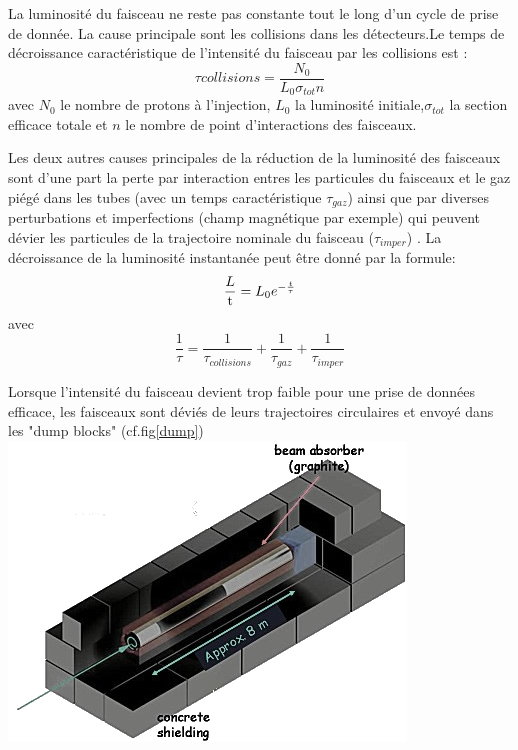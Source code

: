 La luminosité du faisceau ne reste pas constante tout le long d'un cycle de prise de donnée. La cause principale sont les collisions dans les détecteurs.Le temps de décroissance caractéristique de l'intensité du faisceau par les collisions est :
\begin{equation}
\tau{collisions}=\frac{N_{0}}{L_{0}\sigma_{tot}n}
\end{equation}
avec $N_{0}$ le nombre de protons à l'injection, $L_{0}$ la luminosité initiale,$\sigma_{tot}$ la section efficace totale et $n$ le nombre de point d'interactions des faisceaux.

Les deux autres causes principales de la réduction de la luminosité des faisceaux sont d'une part la perte par interaction entres les particules du faisceaux et le gaz piégé dans les tubes (avec un temps caractéristique $\tau_{gaz}$) ainsi que par diverses perturbations et imperfections (champ magnétique par exemple) qui peuvent dévier les particules de la trajectoire nominale du faisceau ($\tau_{imper}$) . 
La décroissance de la luminosité instantanée peut être donné par la formule:
\begin{equation}
\frac{\mathrm \mathcal{L}}{\mathrm t} = L_{0} e^{-\frac{t}{\tau}}
\end{equation}
avec
\begin{equation}
\frac{1}{\tau} = \frac{1}{\tau_{collisions}}+\frac{1}{\tau_{gaz}}+\frac{1}{\tau_{imper}}
\end{equation}

Lorsque l'intensité du faisceau devient trop faible pour une prise de données efficace, les faisceaux sont déviés de leurs trajectoires circulaires et envoyé dans les "dump blocks" (cf.fig\ref{dump})
\marginpar
{
	\includegraphics[width=\marginparwidth]{LHC/dump.png}
    	\label{dump}
}

